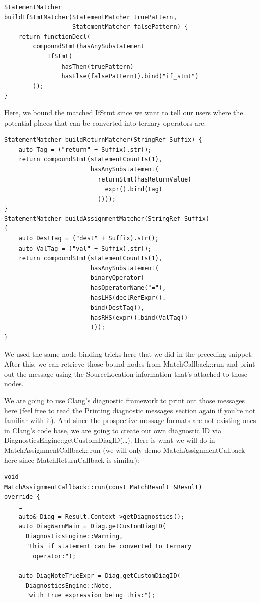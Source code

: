 \begin{enumerate}
\begin{lstlisting}[style=styleCXX]
StatementMatcher
buildIfStmtMatcher(StatementMatcher truePattern,
				   StatementMatcher falsePattern) {
	return functionDecl(
		compoundStmt(hasAnySubstatement
			IfStmt(
				hasThen(truePattern)
				hasElse(falsePattern)).bind("if_stmt")
		));
}
\end{lstlisting}

Here, we bound the matched IfStmt since we want to tell our users where the potential places that can be converted into ternary operators are:

\begin{lstlisting}[style=styleCXX]
StatementMatcher buildReturnMatcher(StringRef Suffix) {
	auto Tag = ("return" + Suffix).str();
	return compoundStmt(statementCountIs(1),
						hasAnySubstatement(
						  returnStmt(hasReturnValue(
						    expr().bind(Tag)
						  ))));
}
StatementMatcher buildAssignmentMatcher(StringRef Suffix)
{
	auto DestTag = ("dest" + Suffix).str();
	auto ValTag = ("val" + Suffix).str();
	return compoundStmt(statementCountIs(1),
						hasAnySubstatement(
						binaryOperator(
						hasOperatorName("="),
						hasLHS(declRefExpr().
						bind(DestTag)),
						hasRHS(expr().bind(ValTag))
						)));
}
\end{lstlisting}

We used the same node binding tricks here that we did in the preceding snippet. After this, we can retrieve those bound nodes from MatchCallback::run and print out the message using the SourceLocation information that's attached to those nodes.

We are going to use Clang's diagnostic framework to print out those messages here (feel free to read the Printing diagnostic messages section again if you're not familiar with it). And since the prospective message formats are not existing ones in Clang's code base, we are going to create our own diagnostic ID via DiagnosticsEngine::getCustomDiagID(…). Here is what we will do in MatchAssignmentCallback::run (we will only demo MatchAssignmentCallback here since MatchReturnCallback is similar):

\begin{lstlisting}[style=styleCXX]
void
MatchAssignmentCallback::run(const MatchResult &Result)
override {
	…
	auto& Diag = Result.Context->getDiagnostics();
	auto DiagWarnMain = Diag.getCustomDiagID(
	  DiagnosticsEngine::Warning,
	  "this if statement can be converted to ternary
	    operator:");
	    
	auto DiagNoteTrueExpr = Diag.getCustomDiagID(
	  DiagnosticsEngine::Note,
	  "with true expression being this:");
	  

\end{lstlisting}
\end{enumerate}
